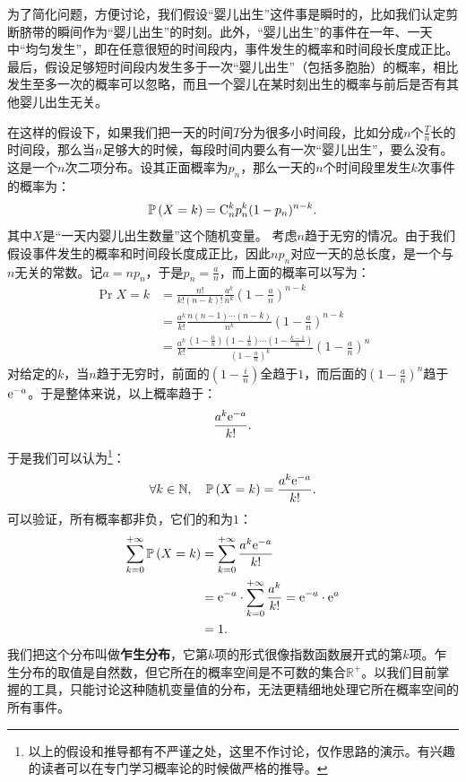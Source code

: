 \documentclass[12pt,UTF8]{ctexbook}
\begin{document}
\begin{so}
    为了简化问题，方便讨论，我们假设“婴儿出生”这件事是瞬时的，比如我们认定剪断脐带的瞬间作为“婴儿出生”的时刻。此外，“婴儿出生”的事件在一年、一天中“均匀发生”，即在任意很短的时间段内，事件发生的概率和时间段长度成正比。最后，假设足够短时间段内发生多于一次“婴儿出生”（包括多胞胎）的概率，相比发生至多一次的概率可以忽略，而且一个婴儿在某时刻出生的概率与前后是否有其他婴儿出生无关。

    在这样的假设下，如果我们把一天的时间$T$分为很多小时间段，比如分成$n$个$\frac{T}{n}$长的时间段，那么当$n$足够大的时候，每段时间内要么有一次“婴儿出生”，要么没有。这是一个$n$次二项分布。设其正面概率为$p_n$，那么一天的$n$个时间段里发生$k$次事件的概率为：
    $$ \mathbb{P}\left(X = k\right) = \mathrm{C}_{n}^{k} p_n^k(1 - p_n)^{n-k}. $$
    其中$X$是“一天内婴儿出生数量”这个随机变量。
    考虑$n$趋于无穷的情况。由于我们假设事件发生的概率和时间段长度成正比，因此$np_n$对应一天的总长度，是一个与$n$无关的常数。记$a = np_n$，于是$p_n = \frac{a}{n}$，而上面的概率可以写为：
    \begin{align*}
        \Pr{X = k} &= \frac{n!}{k!(n - k)!} \frac{a^k}{n^k}\left(1 - \frac{a}{n}\right)^{n-k} \\
        &= \frac{a^k}{k!} \frac{n(n - 1)\cdots(n - k)}{n^k}\left(1 - \frac{a}{n}\right)^{n-k} \\
        &= \frac{a^k}{k!} \frac{\left(1 - \frac{0}{n}\right) \left(1 - \frac{1}{n}\right)\cdots\left(1 - \frac{k-1}{n}\right)}{\left(1 - \frac{a}{n}\right)^k}\left(1 - \frac{a}{n}\right)^{n} 
    \end{align*}
    对给定的$k$，当$n$趋于无穷时，前面的$\left(1 - \frac{i}{n}\right)$全趋于$1$，而后面的$\left(1 - \frac{a}{n}\right)^{n}$趋于$\mathrm{e}^{-a}$。于是整体来说，以上概率趋于：
    $$ \frac{a^k\mathrm{e}^{-a}}{k!}. $$
    于是我们可以认为\footnote{以上的假设和推导都有不严谨之处，这里不作讨论，仅作思路的演示。有兴趣的读者可以在专门学习概率论的时候做严格的推导。}：
    $$ \forall k \in \mathbb{N}, \quad \mathbb{P}\left(X = k\right) = \frac{a^k\mathrm{e}^{-a}}{k!}. $$
    可以验证，所有概率都非负，它们的和为$1$：
    \begin{align*}
        \sum_{k=0}^{+\infty} \mathbb{P}\left(X = k\right) &= \sum_{k=0}^{+\infty} \frac{a^k\mathrm{e}^{-a}}{k!} \\
        &= \mathrm{e}^{-a} \cdot \sum_{k=0}^{+\infty} \frac{a^k}{k!} = \mathrm{e}^{-a} \cdot \mathrm{e}^{a} \\
        &= 1.
    \end{align*}
    我们把这个分布叫做\textbf{乍生分布}，它第$k$项的形式很像指数函数展开式的第$k$项。乍生分布的取值是自然数，但它所在的概率空间是不可数的集合$\mathbb{R}^+$。以我们目前掌握的工具，只能讨论这种随机变量值的分布，无法更精细地处理它所在概率空间的所有事件。


\end{so}
\end{document}
